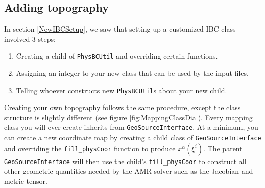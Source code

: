 \documentclass[12pt]{article}
\begin{document}
\subsection{Adding topography}
In section \ref{NewIBCSetup}, we saw that setting up a customized IBC class involved $3$ steps:
\begin{enumerate}
  \item Creating a child of \texttt{PhysBCUtil} and overriding certain functions.
  \item Assigning an integer to your new class that can be used by the input files.
  \item Telling whoever constructs new \texttt{PhysBCUtil}s about your new child.
\end{enumerate}
Creating your own topography follows the same procedure, except the class structure is slightly different (see figure \ref{fig:MappingClassDia}). Every mapping class you will ever create inherits from \texttt{GeoSourceInterface}. At a minimum, you can create a new coordinate map by creating a child class of \texttt{GeoSourceInterface} and overriding the \texttt{fill\_physCoor} function to produce $x^{\alpha}(\xi^i)$. The parent \texttt{GeoSourceInterface} will then use the child's \texttt{fill\_physCoor} to construct all other geometric quantities needed by the AMR solver such as the Jacobian and metric tensor.\\
\end{document}
